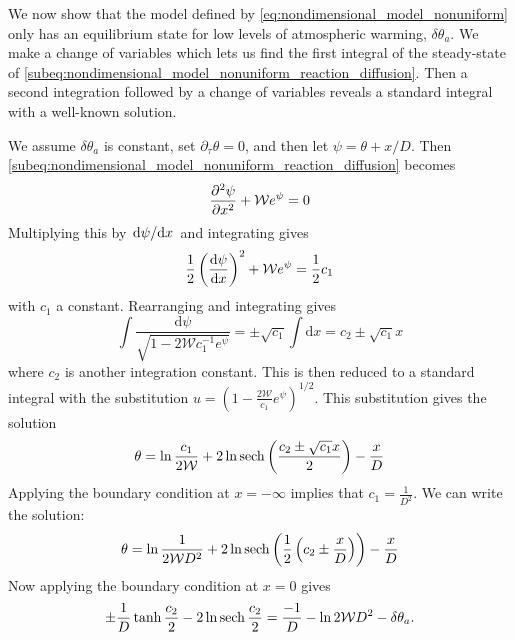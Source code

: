 We now show that the model defined by \cref{eq:nondimensional_model_nonuniform} only has an equilibrium state for low levels of atmospheric warming, $\delta\theta_a$.
We make a change of variables which lets us find the first integral of the steady-state of 
\cref{subeq:nondimensional_model_nonuniform_reaction_diffusion}. Then a second integration followed by a change of variables reveals a standard integral with a
well-known solution.

We assume $\delta\theta_a$ is constant, set $\partial_{\tau}\theta = 0$, and then let $\psi = \theta + x/D$. Then \cref{subeq:nondimensional_model_nonuniform_reaction_diffusion} becomes
\begin{equation}
  \pdv[2]{\psi}{x} + \mathcal{W}e^{\psi} = 0
\end{equation}
Multiplying this by $\dv*{\psi}{x}$ and integrating gives
\begin{equation}
  \frac{1}{2} \left(\dv{\psi}{x}\right)^2 + \mathcal{W}e^{\psi} = \frac{1}{2} c_1
\end{equation}
with $c_1$ a constant.
Rearranging and integrating gives
\begin{equation}
  \int \frac{\mathrm{d}\psi}{\sqrt{1 - 2\mathcal{W}c_1^{-1} e^{\psi}}} = \pm\sqrt{c_1} \int \mathrm{d}x = c_2 \pm \sqrt{c_1} x 
\end{equation}
where $c_2$ is another integration constant. This is then reduced to a standard integral\cite{riley2006} with the substitution $u = \left(1 - \frac{2\mathcal{W}}{c_1} e^{\psi}\right)^{1/2}$.
This substitution gives the solution
\begin{equation}
  \label{eq:nondimensional_model_nonuniform_solution_general}
  \theta = \ln \frac{c_1}{2\mathcal{W}} + 2 \ln \sech \left( \frac{c_2 \pm \sqrt{c_1} x}{2}\right) - \frac{x}{D}
\end{equation}
Applying the boundary condition at $x = -\infty$ implies that $c_1 = \frac{1}{D^2}$.  We can write the solution:
\begin{equation}
  \label{eq:nondimensional_model_nonuniform_solution_one_bc}
  \theta = \ln \frac{1}{2\mathcal{W}D^2} + 2 \ln \sech \left( \frac{1}{2} \left(c_2 \pm \frac{x}{D}\right)\right) - \frac{x}{D}
\end{equation}
Now applying the boundary condition at $x = 0$ gives
\begin{equation}
  \label{eq:nondimensional_model_nonuniform_upper_boundary_condition}
  \pm\frac{1}{D}\tanh \frac{c_2}{2} - 2 \ln \sech \frac{c_2}{2} = \frac{-1}{D} - \ln 2\mathcal{W}D^2 - \delta\theta_a.
\end{equation}
